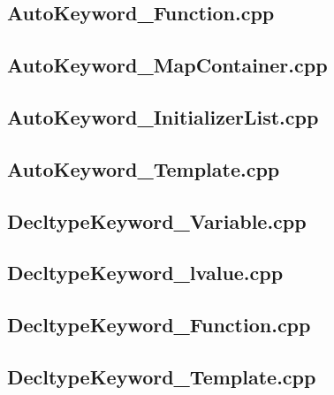 \documentclass[11pt]{report}
\begin{document}
\begin{appendix}
\subsection{AutoKeyword\_Function.cpp}
\label{AutoKeyword_Function}


\subsection{AutoKeyword\_MapContainer.cpp}
\label{AutoKeyword_MapContainer}


\subsection{AutoKeyword\_InitializerList.cpp}
\label{AutoKeyword_InitializerList}


\subsection{AutoKeyword\_Template.cpp}
\label{AutoKeyword_Template}


\subsection{DecltypeKeyword\_Variable.cpp}
\label{DecltypeKeyword_Variable}


\subsection{DecltypeKeyword\_lvalue.cpp}
\label{DecltypeKeyword_lvalue}


\subsection{DecltypeKeyword\_Function.cpp}
\label{DecltypeKeyword_Function}


\subsection{DecltypeKeyword\_Template.cpp}
\label{DecltypeKeyword_Template}



\end{appendix}
\end{document}
